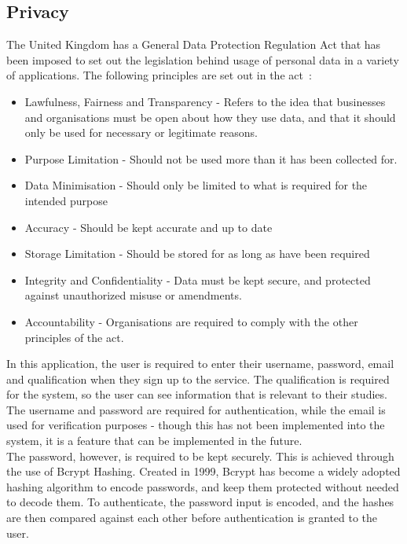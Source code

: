\documentclass[]{final_report}
\begin{document}
\subsection{Privacy}
The United Kingdom has a General Data Protection Regulation Act that has been imposed to set out the legislation behind usage of personal data in a variety of applications. The following principles are set out in the act~\cite{GDPR}:

\begin{itemize}
	\item Lawfulness, Fairness and Transparency - Refers to the idea that businesses and organisations must be open about how they use data, and that it should only be used for necessary or legitimate reasons.
	\item Purpose Limitation - Should not be used more than it has been collected for.
	\item Data Minimisation - Should only be limited to what is required for the intended purpose
	\item Accuracy - Should be kept accurate and up to date
	\item Storage Limitation - Should be stored for as long as have been required
	\item Integrity and Confidentiality - Data must be kept secure, and protected against unauthorized misuse or amendments.
	\item Accountability - Organisations are required to comply with the other principles of the act.
\end{itemize}

In this application, the user is required to enter their username, password, email and qualification when they sign up to the service. The qualification is required for the system, so the user can see information that is relevant to their studies. The username and password are required for authentication, while the email is used for verification purposes - though this has not been implemented into the system, it is a feature that can be implemented in the future.\\

The password, however, is required to be kept securely. This is achieved through the use of Bcrypt Hashing. Created in 1999, Bcrypt has become a widely adopted hashing algorithm to encode passwords, and keep them protected without needed to decode them. To authenticate, the password input is encoded, and the hashes are then compared against each other before authentication is granted to the user. 
\end{document}
